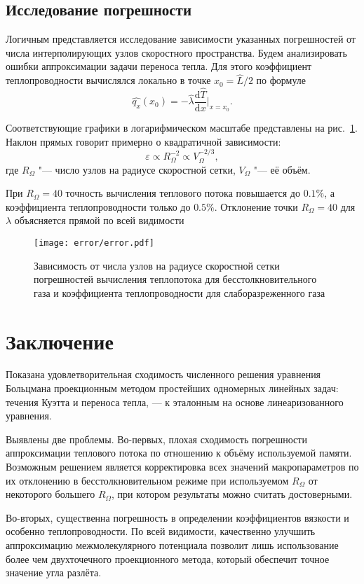 \documentclass[a4paper,12pt]{article}
\newcommand{\D}{\mathrm{d}}
\begin{document}
\subsection{Исследование погрешности}

Логичным представляется исследование зависимости указанных погрешностей от числа интерполирующих узлов
скоростного пространства. Будем анализировать ошибки аппроксимации задачи переноса тепла.
Для этого коэффициент теплопроводности вычислялся локально в точке \(x_0=\hat L/2\) по формуле
\[ \hat{q_x}(x_0) = -\hat{\lambda}\frac{\D\hat T}{\D x}\bigg|_{x=x_0}. \]

Соответствующие графики в логарифмическом масштабе представлены на рис.~\ref{fig:error}.
Наклон прямых говорит примерно о квадратичной зависимости:
\[ \varepsilon \propto R_\Omega^{-2} \propto V_\Omega^{-2/3}, \]
где \(R_\Omega\) "--- число узлов на радиусе скоростной сетки, \(V_\Omega\) "--- её объём.

При \(R_\Omega = 40\) точность вычисления теплового потока повышается до \(0.1\%\),
а коэффициента теплопроводности только до \(0.5\%\).
Отклонение точки \(R_\Omega = 40\) для \(\lambda\) объясняется прямой по всей видимости 

\begin{figure}
	\centering
	\texttt{[image: error/error.pdf]}
	\caption{
		Зависимость от числа узлов на радиусе скоростной сетки погрешностей вычисления 
		теплопотока для бесстолкновительного газа и коэффициента теплопроводности для слаборазреженного газа
	}\label{fig:error}
\end{figure}

\section{Заключение}

Показана удовлетворительная сходимость численного решения уравнения Больцмана проекционным методом
простейших одномерных линейных задач: течения Куэтта и переноса тепла, --- к эталонным на основе
линеаризованного уравнения.

Выявлены две проблемы. Во-первых, плохая сходимость погрешности аппроксимации теплового потока по отношению к
объёму используемой памяти. Возможным решением является корректировка всех значений макропараметров
по их отклонению в бесстолкновительном режиме при используемом \(R_\Omega\) от некоторого большего \(R_\Omega\),
при котором результаты можно считать достоверными.

Во-вторых, существенна погрешность в определении коэффициентов вязкости и особенно теплопроводности.
По всей видимости, качественно улучшить аппроксимацию межмолекулярного потенциала позволит лишь использование
более чем двухточечного проекционного метода, который обеспечит точное значение угла разлёта.

\printbibliography
\end{document}
